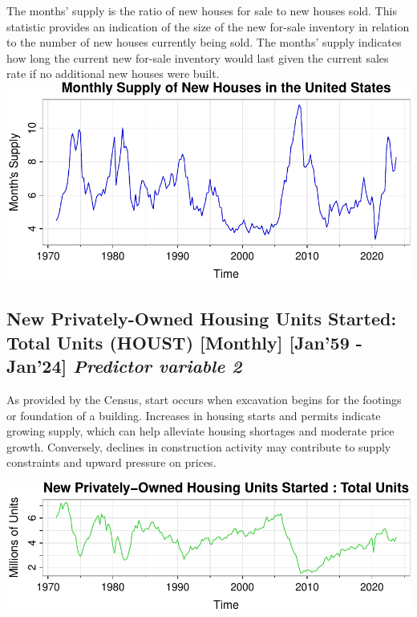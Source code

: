 \documentclass[
  man]{apa6}
\begin{document}
The months' supply is the ratio of new houses for sale to new houses sold. This statistic provides an indication of the size of the new for-sale inventory in relation to the number of new houses currently being sold. The months' supply indicates how long the current new for-sale inventory would last given the current sales rate if no additional new houses were built.
\includegraphics{STAT429Report_files/figure-latex/unnamed-chunk-3-1.pdf}

\subsection{\texorpdfstring{New Privately-Owned Housing Units Started: Total Units (HOUST) {[}Monthly{]} {[}Jan'59 - Jan'24{]} \emph{Predictor variable 2}}{New Privately-Owned Housing Units Started: Total Units (HOUST) {[}Monthly{]} {[}Jan'59 - Jan'24{]} Predictor variable 2}}\label{new-privately-owned-housing-units-started-total-units-houst-monthly-jan59---jan24-predictor-variable-2}

As provided by the Census, start occurs when excavation begins for the footings or foundation of a building. Increases in housing starts and permits indicate growing supply, which can help alleviate housing shortages and moderate price growth. Conversely, declines in construction activity may contribute to supply constraints and upward pressure on prices.

\includegraphics{STAT429Report_files/figure-latex/unnamed-chunk-4-1.pdf}
\end{document}
